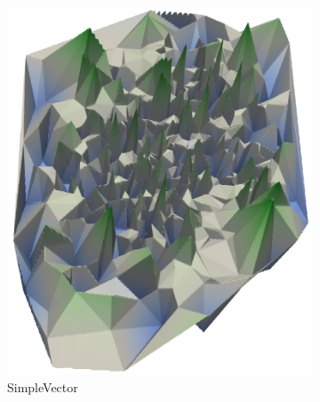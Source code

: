 \begin{figure}[t]
  \centering
	\begin{subfigure}[b]{0.43\textwidth}
    \includegraphics[width=\textwidth]{figures/coolidge-af-space-sim-vec.png}
		\caption{SimpleVector}
	\end{subfigure}
	~
	\begin{subfigure}[b]{0.43\textwidth}

\end{subfigure}
\end{figure}
